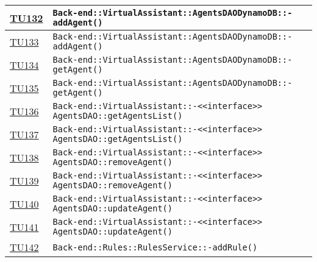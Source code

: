 \begin{longtable}{|>{\centering}m{1cm}|m{12cm}<{\centering}|}
\hyperlink{TU132}{TU132} & \texttt{Back-end::VirtualAssistant::AgentsDAODynamoDB::-\linebreak addAgent()}\\ \hline

\hyperlink{TU133}{TU133} & \texttt{Back-end::VirtualAssistant::AgentsDAODynamoDB::-\linebreak addAgent()}\\ \hline

\hyperlink{TU134}{TU134} & \texttt{Back-end::VirtualAssistant::AgentsDAODynamoDB::-\linebreak getAgent()}\\ \hline

\hyperlink{TU135}{TU135} & \texttt{Back-end::VirtualAssistant::AgentsDAODynamoDB::-\linebreak getAgent()}\\ \hline

\hyperlink{TU136}{TU136} & \texttt{Back-end::VirtualAssistant::-\linebreak <<interface>> AgentsDAO::getAgentsList()}\\ \hline

\hyperlink{TU137}{TU137} & \texttt{Back-end::VirtualAssistant::-\linebreak <<interface>> AgentsDAO::getAgentsList()}\\ \hline

\hyperlink{TU138}{TU138} & \texttt{Back-end::VirtualAssistant::-\linebreak <<interface>> AgentsDAO::removeAgent()}\\ \hline

\hyperlink{TU139}{TU139} & \texttt{Back-end::VirtualAssistant::-\linebreak <<interface>> AgentsDAO::removeAgent()}\\ \hline

\hyperlink{TU140}{TU140} & \texttt{Back-end::VirtualAssistant::-\linebreak <<interface>> AgentsDAO::updateAgent()}\\ \hline

\hyperlink{TU141}{TU141} & \texttt{Back-end::VirtualAssistant::-\linebreak <<interface>> AgentsDAO::updateAgent()}\\ \hline

\hyperlink{TU142}{TU142} & \texttt{Back-end::Rules::RulesService::-\linebreak addRule()}\\ \hline


\end{longtable}
